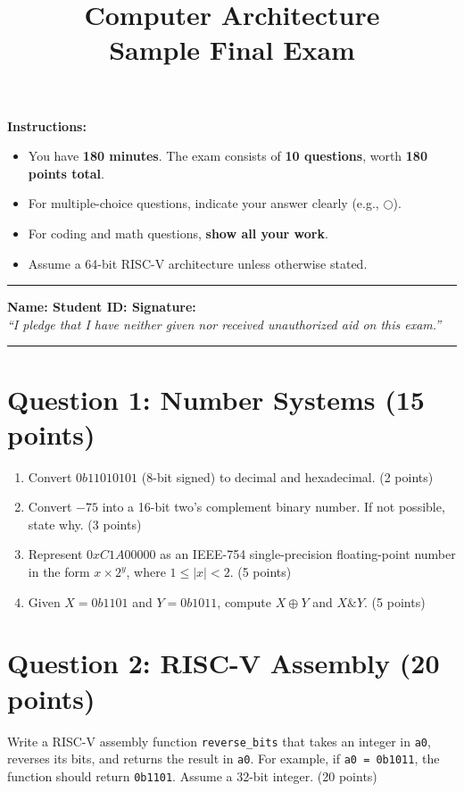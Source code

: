\documentclass[11pt]{article}
\title{Computer Architecture \\ Sample Final Exam \\}
\author{}
\date{}
\begin{document}
\maketitle
\thispagestyle{empty}

\textbf{Instructions:}
\begin{itemize}[noitemsep]
    \item You have \textbf{180 minutes}. The exam consists of \textbf{10 questions}, worth \textbf{180 points total}.
    \item For multiple-choice questions, indicate your answer clearly (e.g., \(\bigcirc\)).
    \item For coding and math questions, \textbf{show all your work}.
    \item Assume a 64-bit RISC-V architecture unless otherwise stated.
\end{itemize}

\hrule
\vspace{0.2cm}

\textbf{Name: \hfill Student ID: \hfill Signature:} \\
\textit{``I pledge that I have neither given nor received unauthorized aid on this exam.''}

\vspace{0.2cm}
\hrule

\section*{Question 1: Number Systems (15 points)}
\begin{enumerate}[label=\textbf{Q1.\arabic*}]
    \item Convert \(0b11010101\) (8-bit signed) to decimal and hexadecimal. (2 points)
    \item Convert \(-75\) into a 16-bit two's complement binary number. If not possible, state why. (3 points)
    \item Represent \(0xC1A00000\) as an IEEE-754 single-precision floating-point number in the form \(x \times 2^y\), where \(1 \leq |x| < 2\). (5 points)
    \item Given \(X = 0b1101\) and \(Y = 0b1011\), compute \(X \oplus Y\) and \(X \& Y\). (5 points)
\end{enumerate}

\section*{Question 2: RISC-V Assembly (20 points)}
Write a RISC-V assembly function \texttt{reverse\_bits} that takes an integer in \texttt{a0}, reverses its bits, and returns the result in \texttt{a0}. For example, if \texttt{a0 = 0b1011}, the function should return \texttt{0b1101}. Assume a 32-bit integer. (20 points)
\end{document}
